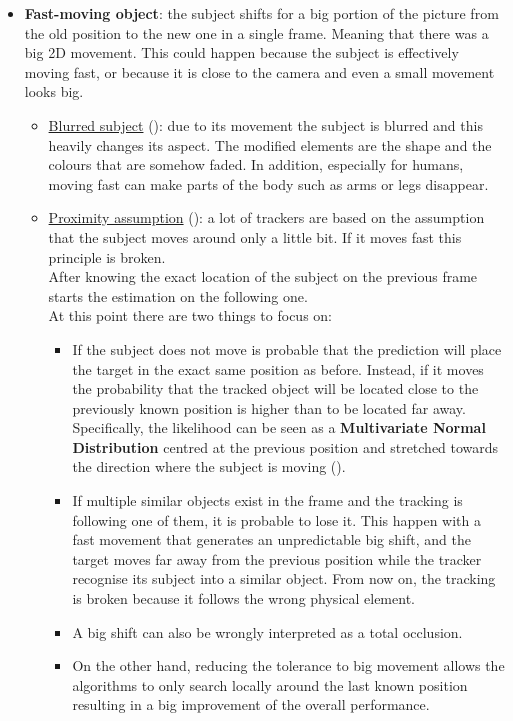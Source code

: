 \begin{itemize}
	\item \textbf{Fast-moving object}: the subject shifts for a big portion of the picture from the old position to the new one in a single frame. Meaning that there was a big 2D movement. This could happen because the subject is effectively moving fast, or because it is close to the camera and even a small movement looks big.
	\begin{itemize}
		\item \underline{Blurred subject} (): due to its movement the subject is blurred and this heavily changes its aspect. The modified elements are the shape and the colours that are somehow faded. In addition, especially for humans, moving fast can make parts of the body such as arms or legs disappear.
		\item \underline{Proximity assumption} (): a lot of trackers are based on the assumption that the subject moves around only a little bit. If it moves fast this principle is broken.\\
		After knowing the exact location of the subject on the previous frame starts the estimation on the following one.\\
		At this point there are two things to focus on:
		\begin{itemize}[] %
			\item If the subject does not move is probable that the prediction will place the target in the exact same position as before. Instead, if it moves the probability that the tracked object will be located close to the previously known position is higher than to be located far away. Specifically, the likelihood can be seen as a \textbf{Multivariate Normal Distribution} centred at the previous position and stretched towards the direction where the subject is moving ().
			\item If multiple similar objects exist in the frame and the tracking is following one of them, it is probable to lose it. This happen with a fast movement that generates an unpredictable big shift, and the target moves far away from the previous position while the tracker recognise its subject into a similar object. From now on, the tracking is broken because it follows the wrong physical element.
			\item A big shift can also be wrongly interpreted as a total occlusion.
			\item On the other hand, reducing the tolerance to big movement allows the algorithms to only search locally around the last known position resulting in a big improvement of the overall performance.
		\end{itemize}		
	\end{itemize}


\end{itemize}

